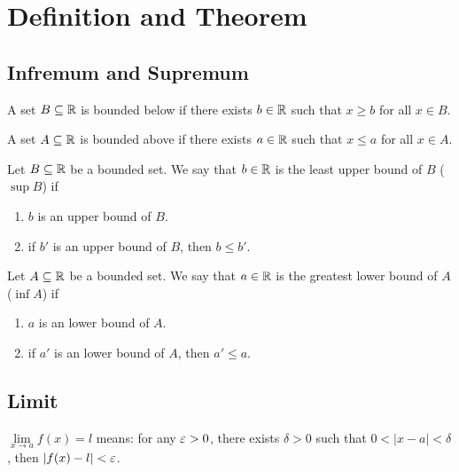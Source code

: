 \chapter{Definition and Theorem}

\section*{Infremum and Supremum}

\begin{definition*}
  A set $B \subseteq \mathbb R$ is bounded below if there exists $b \in \mathbb R$ such that $ x \ge b$ for all $x \in B$. 
\end{definition*}

\begin{definition*}
  A set $A \subseteq \mathbb R$ is bounded above if there exists $a \in \mathbb R$ such that $ x \le a$ for all $x \in A$. 
\end{definition*}

\begin{definition*}
  Let $B \subseteq \mathbb R$ be a bounded set. We say that $b \in \mathbb R$ is the least upper bound of $B$ ($\sup B$) if
  \begin{enumerate}
    \item $b$ is an upper bound of $B$.
    \item if $b'$ is an upper bound of $B$, then $b \le b'$.
  \end{enumerate}
\end{definition*}

\begin{definition*}
  Let $A \subseteq \mathbb R$ be a bounded set. We say that $a \in \mathbb R$ is the greatest lower bound of $A$ ($\inf A$) if
  \begin{enumerate}
    \item $a$ is an lower bound of $A$.
    \item if $a'$ is an lower bound of $A$, then $a' \le a$.
  \end{enumerate}
\end{definition*}

\section*{Limit}

\begin{definition*}
  $\lim\limits_{x\to a} f(x) = l$ means: for any $\varepsilon > 0$, there exists $\delta > 0$ such that $0 < |x-a| < \delta$, then $|f(x)-l| < \varepsilon$.
\end{definition*}

